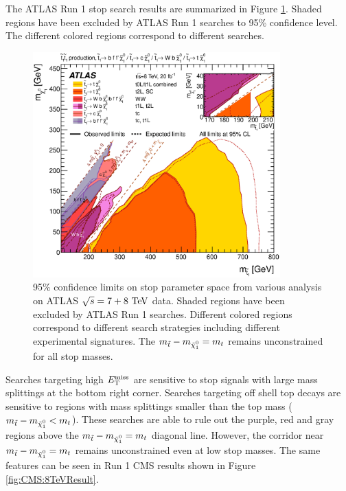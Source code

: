 \indent The ATLAS Run 1 stop search results are summarized in Figure \ref{fig:ATLAS:8TeVResult}.  Shaded regions have been excluded by ATLAS Run 1 searches to 95\% confidence level.  The different colored regions correspond to different searches.  \\

\begin{figure}[h!]
\centering
    \includegraphics[width=0.85\textwidth]{figures/8TeV/ATLAS_SUSY_Stop_tLSP_201507.eps}
\caption[95\% confidence limits on stop parameter space from various analysis on ATLAS $\sqrt{s} = 7+8 \tev$ data]{ 95\% confidence limits on stop parameter space from various analysis on ATLAS $\sqrt{s} = 7+8 \tev$ data.  Shaded regions have been excluded by ATLAS Run 1 searches.  Different colored regions correspond to different search strategies including different experimental signatures. The $m_{\stop}-m_{\ninoone} = m_t$ remains unconstrained for all stop masses. }
\label{fig:ATLAS:8TeVResult}
\end{figure}

\indent Searches targeting high $E_{\mathrm{T}}^{\mathrm{miss}}$ are sensitive to stop signals with large mass splittings at the bottom right corner. Searches targeting off shell top decays are sensitive to regions with mass splittings smaller than the top mass ($m_{\stop}-m_{\ninoone} < m_t$).  These searches are able to rule out the purple, red and gray regions above the $m_{\stop}-m_{\ninoone} = m_t$ diagonal line.  However, the corridor near $m_{\stop}-m_{\ninoone} = m_t$ remains unconstrained even at low stop masses.  The same features can be seen in Run 1 CMS results shown in Figure \ref{fig:CMS:8TeVResult}. \\

